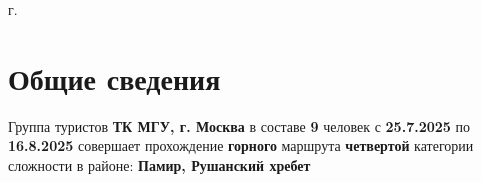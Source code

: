 \documentclass[a5paper, 12pt, twoside]{article}
\begin{document}
    { г.\par}

\newpage %
    \strut



    \setlength\parindent{0pt}

\newpage %

    \section{Общие сведения}\label{s:group}
        Группа туристов \textbf{%
        ТК МГУ, г. Москва}
        в составе \textbf{%
        9}
        человек
        с \textbf{%
        25.7.2025}
        по \textbf{%
        16.8.2025} совершает
        прохождение \textbf{горного} маршрута \textbf{%
        четвертой} категории сложности
        в районе: \textbf{%
        Памир, Рушанский хребет}
        \vspace{0.5cm}
        
\end{document}
